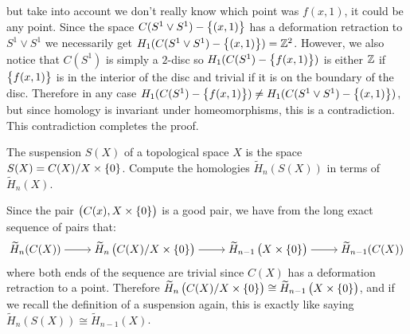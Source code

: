 \documentclass[11pt,a4paper]{article}
\begin{document}
\begin{solution}
\[{    }
  \]
  but take into account we don't really know which point was $f(x,1)$,
  it could be any point.
  Since the space $C(S^1 \vee S^1) - \left\{(x,1)\right\}$ has a deformation retraction
  to $S^1 \vee S^1$ we necessarily get $H_1(C(S^1 \vee S^1) - \left\{(x,1)\right\}) = \mathbb{Z}^2$.
  However, we also notice that $C(S^1)$ is simply a $2$-disc
  so $H_1(C(S^1) - \left\{f(x,1)\right\})$ is either $\mathbb{Z}$ if $\left\{f(x,1)\right\}$ is in the
  interior of the disc and trivial if it is on the boundary of the disc.
  Therefore in any case $H_1(C(S^1) - \left\{f(x,1)\right\}) \neq H_1(C(S^1 \vee S^1) - \left\{(x,1)\right\})$,
  but since homology is invariant under homeomorphisms, this is a contradiction.
  This contradiction completes the proof.
\end{solution}

\begin{exercise}
  \label{ex:two-four}
  The suspension $S(X)$ of a topological space $X$ is the space
  $S(X) = C(X) / X \times \left\{0\right\}$.
  Compute the homologies $\widetilde H_n(S(X))$
  in terms of $\widetilde H_n(X)$.
\end{exercise}
\begin{solution}
  Since the pair $\del{C(x),X \times \set{0}}$ is a good pair,
  we have from the long exact sequence of pairs that:
  \[\begin{tikzcd}[ampersand replacement=\&,cramped]
    {\widetilde H_n(C(X))} \& {\widetilde H_n\left(C(X)/X \times \set{0}\right)} \& {\widetilde H_{n-1}\left(X \times \set{0}\right)} \& {\widetilde H_{n-1}(C(X))}
    \arrow[from=1-1, to=1-2]
    \arrow[from=1-2, to=1-3]
    \arrow[from=1-3, to=1-4]
  \end{tikzcd}\]
  where both ends of the sequence are trivial since $C(X)$ has
  a deformation retraction to a point.
  Therefore $\widetilde H_n\left(C(X)/X \times \left\{0\right\}\right) \cong
  \widetilde H_{n-1}\left(X \times \left\{0\right\}\right)$,
  and if we recall the definition of a suspension again,
  this is exactly like saying
  $\widetilde H_n(S(X)) \cong \widetilde H_{n-1}(X)$.
\end{solution}
\end{document}
